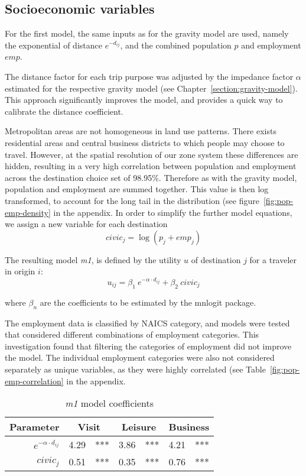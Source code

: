 \subsection{Socioeconomic variables}
For the first model, the same inputs as for the gravity model are used, namely the exponential of distance $e^{-d_{ij}}$, and the combined population $p$ and employment $emp$.

The distance factor for each trip purpose was adjusted by the impedance factor $\alpha$ estimated for the respective gravity model (see Chapter~\ref{section:gravity-model}). This approach significantly improves the model, and provides a quick way to calibrate the distance coefficient.

Metropolitan areas are not homogeneous in land use patterns. There exists residential areas and central business districts to which people may choose to travel. However, at the spatial resolution of our zone system these differences are hidden, resulting in a very high correlation between population and employment across the destination choice set of 98.95\%. Therefore as with the gravity model, population and employment are summed together. This value is  then log transformed, to account for the long tail in the distribution (see figure~\ref{fig:pop-emp-density} in the appendix. In order to simplify the further model equations, we assign a new variable for each destination
$$ civic_j = \log\left( p_j + emp_j \right) $$

The resulting model \textit{m1}, is defined by the utility $u$ of destination $j$ for a traveler in origin $i$: 
$$ u_{ij} = \beta_1~e^{-\alpha \cdot d_{ij}} + \beta_2~civic_j $$

where $\beta_n$ are the coefficients to be estimated by the mnlogit package. 

The employment data is classified by NAICS category, and models were tested that considered different combinations of employment categories. This investigation found that filtering the categories of employment did not improve the model. The individual employment categories were also not considered separately as unique variables, as they were highly correlated (see Table~\ref{fig:pop-emp-correlation} in the appendix.

\begin{table}[H]
\centering
\caption{\textit{m1} model coefficients}
\label{table:m1-coeff}
\begin{tabular}{@{}rrlrlrl@{}}
  \toprule
 Parameter & \multicolumn{2}{c}{Visit} & \multicolumn{2}{c}{Leisure} & \multicolumn{2}{c}{Business} \\ \midrule
  $e^{-\alpha \cdot d_{ij}}$ 	& 4.29 & *** & 3.86 & *** & 4.21 & *** \\ 
  $civic_j$ 		& 0.51 & *** & 0.35 & *** & 0.76 & *** \\   
   \bottomrule
\end{tabular}
\end{table}

